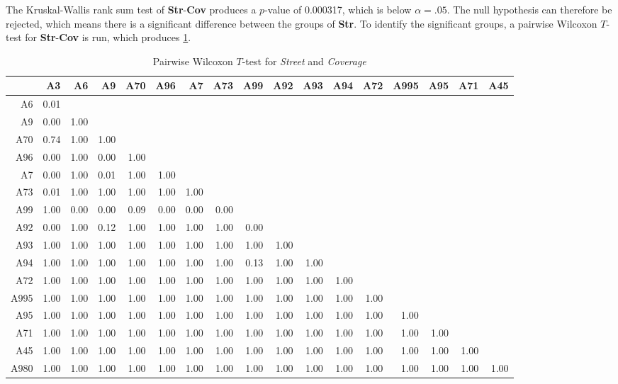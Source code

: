 The Kruskal-Wallis rank sum test of \textbf{Str}-\textbf{Cov} produces a $p$-value of 0.000317, which is below $\alpha=.05$. The null hypothesis can therefore be rejected, which means there is a significant difference between the groups of \textbf{Str}. To identify the significant groups, a pairwise Wilcoxon $T$-test for \textbf{Str}-\textbf{Cov} is run, which produces \cref{tbl:wilcoxon_baysis_matched_Str_Cov}. 
\begin{table}[ht!]
	\tiny
	\setlength{\tabcolsep}{4pt}
	\centering
	\begin{tabular}{rrrrrrrrrrrrrrrrr}
	  	\toprule
				& A3   & A6   & A9   & A70  & A96  & A7   & A73 & A99 & A92 & A93 & A94 & A72 & A995 & A95 & A71 & A45 \\ 
	  	\midrule
		A6 		& 0.01 &  &  &  &  &  &  &  &  &  &  &  &  &  &  &  \\ 
	  	A9 		& 0.00 & 1.00 &  &  &  &  &  &  &  &  &  &  &  &  &  &  \\ 
	  	A70 	& 0.74 & 1.00 & 1.00 &  &  &  &  &  &  &  &  &  &  &  &  &  \\ 
	  	A96 	& 0.00 & 1.00 & 0.00 & 1.00 &  &  &  &  &  &  &  &  &  &  &  &  \\ 
	  	A7 		& 0.00 & 1.00 & 0.01 & 1.00 & 1.00 &  &  &  &  &  &  &  &  &  &  &  \\ 
	  	A73 	& 0.01 & 1.00 & 1.00 & 1.00 & 1.00 & 1.00 &  &  &  &  &  &  &  &  &  &  \\ 
	  	A99 	& 1.00 & 0.00 & 0.00 & 0.09 & 0.00 & 0.00 & 0.00 &  &  &  &  &  &  &  &  &  \\ 
	  	A92 	& 0.00 & 1.00 & 0.12 & 1.00 & 1.00 & 1.00 & 1.00 & 0.00 &  &  &  &  &  &  &  &  \\ 
	  	A93 	& 1.00 & 1.00 & 1.00 & 1.00 & 1.00 & 1.00 & 1.00 & 1.00 & 1.00 &  &  &  &  &  &  &  \\ 
	  	A94 	& 1.00 & 1.00 & 1.00 & 1.00 & 1.00 & 1.00 & 1.00 & 0.13 & 1.00 & 1.00 &  &  &  &  &  &  \\ 
	  	A72 	& 1.00 & 1.00 & 1.00 & 1.00 & 1.00 & 1.00 & 1.00 & 1.00 & 1.00 & 1.00 & 1.00 &  &  &  &  &  \\ 
	  	A995 	& 1.00 & 1.00 & 1.00 & 1.00 & 1.00 & 1.00 & 1.00 & 1.00 & 1.00 & 1.00 & 1.00 & 1.00 &  &  &  &  \\ 
	  	A95 	& 1.00 & 1.00 & 1.00 & 1.00 & 1.00 & 1.00 & 1.00 & 1.00 & 1.00 & 1.00 & 1.00 & 1.00 & 1.00 &  &  &  \\ 
	  	A71 	& 1.00 & 1.00 & 1.00 & 1.00 & 1.00 & 1.00 & 1.00 & 1.00 & 1.00 & 1.00 & 1.00 & 1.00 & 1.00 & 1.00 &  &  \\ 
	  	A45 	& 1.00 & 1.00 & 1.00 & 1.00 & 1.00 & 1.00 & 1.00 & 1.00 & 1.00 & 1.00 & 1.00 & 1.00 & 1.00 & 1.00 & 1.00 &  \\ 
	  	A980 	& 1.00 & 1.00 & 1.00 & 1.00 & 1.00 & 1.00 & 1.00 & 1.00 & 1.00 & 1.00 & 1.00 & 1.00 & 1.00 & 1.00 & 1.00 & 1.00 \\ 
	   	\bottomrule
	\end{tabular}
	\caption{Pairwise Wilcoxon $T$-test for \textit{Street} and \textit{Coverage}}
	\label{tbl:wilcoxon_baysis_matched_Str_Cov}
\end{table}
